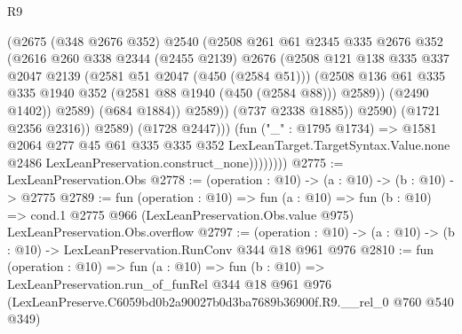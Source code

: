 \begin{lexlean}{R9}
\begin{coremodule}
                                  (@2675
                                    (@348 @2676 @352)
                                    @2540
                                    (@2508
                                      @261
                                      @61
                                      @2345
                                      @335
                                      @2676
                                      @352
                                      (@2616
                                        @260
                                        @338
                                        @2344
                                        (@2455 @2139)
                                        @2676
                                        (@2508
                                          @121
                                          @138
                                          @335
                                          @337
                                          @2047
                                          @2139
                                          (@2581 @51 @2047 (@450 (@2584 @51)))
                                          (@2508
                                            @136
                                            @61
                                            @335
                                            @335
                                            @1940
                                            @352
                                            (@2581 @88 @1940 (@450 (@2584 @88)))
                                            @2589))
                                        (@2490 @1402))
                                      @2589)
                                    (@684 @1884))
                                  @2589))
                              (@737 @2338 @1885))
                            @2590)
                          (@1721 @2356 @2316))
                        @2589)
                      (@1728 @2447)))
                  (fun ("_" : @1795 @1734) =>
                  @1581
                    @2064
                    @277
                    @45
                    @61
                    @335
                    @335
                    @352
                    LexLeanTarget.TargetSyntax.Value.none
                    @2486
                    LexLeanPreservation.construct_none))))))))
@2775 := LexLeanPreservation.Obs
@2778 := (operation : @10) -> (a : @10) -> (b : @10) -> @2775
@2789 := fun (operation : @10) =>
  fun (a : @10) =>
  fun (b : @10) =>
  cond.{1} @2775 @966 (LexLeanPreservation.Obs.value @975) LexLeanPreservation.Obs.overflow
@2797 := (operation : @10) ->
  (a : @10) -> (b : @10) -> LexLeanPreservation.RunConv @344 @18 @961 @976
@2810 := fun (operation : @10) =>
  fun (a : @10) =>
  fun (b : @10) =>
  LexLeanPreservation.run_of_funRel
    @344
    @18
    @961
    @976
    (LexLeanPreserve.C6059bd0b2a90027b0d3ba7689b36900f.R9.__rel_0 @760 @540 @349)
\end{coremodule}
\end{lexlean}
